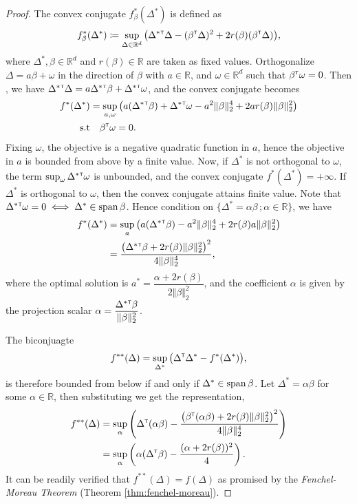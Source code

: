 \documentclass[12pt]{article}
\begin{document}
\begin{proof}
    The convex conjugate $f_\beta^*(\Delta^*)$ is defined as \[
    f_\beta^*(\Delta^*) \coloneqq \sup_{\Delta\in\mathbb{R}^d} \big( \Delta^*{^{\scriptscriptstyle \sf T}}\Delta - (\beta^{\scriptscriptstyle \sf T}\Delta)^2 + 2r(\beta) (\beta^{\scriptscriptstyle \sf T}\Delta) \big),
    \]where $\Delta^*,\beta \in\mathbb{R}^d$ and $r(\beta)\in\mathbb{R}$ are taken as fixed values. Orthogonalize $\Delta = a\beta + \omega$ in the direction of $\beta$ with $a\in\mathbb{R}$, and $\omega\in\mathbb{R}^d$ such that $\beta^{\scriptscriptstyle \sf T} \omega = 0$. Then , we have $\Delta^*{^{\scriptscriptstyle \sf T}}\Delta = a\Delta^*{^{\scriptscriptstyle \sf T}}\beta + \Delta^*{^{\scriptscriptstyle \sf T}}\omega$, and the convex conjugate becomes \begin{align*}
         f^*(\Delta^*) &= \sup_{a,\omega}\big(a (\Delta^*{^{\scriptscriptstyle \sf T}}\beta) + \Delta^*{^{\scriptscriptstyle \sf T}}\omega - a^2\Vert \beta\Vert_2^4 + 2ar(\beta)\Vert\beta\Vert_2^2 \big)\\
         \rm{s.t}&\quad \beta^{\scriptscriptstyle \sf T}\omega = 0.
    \end{align*}
    Fixing $\omega$, the objective is a negative quadratic function in $a$, hence the objective in $a$ is bounded from above by a finite value. Now, if $\Delta^*$ is not orthogonal to $\omega$, the term $\sup_\omega \Delta^*{^{\scriptscriptstyle \sf T}}\omega$ is unbounded, and the convex conjugate $f^*(\Delta^*) = +\infty$. If $\Delta^*$ is orthogonal to $\omega$, then the convex conjugate attains finite value. Note that $\Delta^*{^{\scriptscriptstyle \sf T}} \omega = 0 \iff \Delta^* \in \operatorname{span}{\beta}$. Hence condition on $\{\Delta^* = \alpha \beta\,;\alpha\in\mathbb{R}\}$, we have \begin{align*}
        f^*(\Delta^*) &= \sup_a \big(a(\Delta^*{^{\scriptscriptstyle \sf T}}\beta) - a^2 \Vert \beta\Vert_2^4 + 2r(\beta) a\Vert\beta\Vert_2^2 \big)\\
        &=\dfrac{\big(\Delta^*{^{\scriptscriptstyle \sf T}}\beta + 2r(\beta) \Vert \beta\Vert_2^2\big)^2}{4\Vert \beta\Vert_2^4},
    \end{align*} where the optimal solution is $a^* = \dfrac{\alpha + 2r(\beta)}{2\Vert \beta\Vert_2^2}$, and the coefficient $\alpha$ is given by the projection scalar $\alpha = \dfrac{\Delta^*{^{\scriptscriptstyle \sf T}}\beta}{\Vert\beta\Vert_2^2}$.

    The biconjuagte \[f^{**}(\Delta) = \sup_{\Delta^*} \big(\Delta^{\scriptscriptstyle \sf T}\Delta^* - f^*(\Delta^*)\big),\]
    is therefore bounded from below if and only if $\Delta^* \in \operatorname{span}{\beta}$. Let $\Delta^* = \alpha \beta$ for some $\alpha \in \mathbb{R}$, then substituting we get the representation,
    \begin{align*}
        f^{**}(\Delta) &= \sup_{\alpha} \left( \Delta^{\scriptscriptstyle \sf T} (\alpha\beta) - \dfrac{\big(\beta^{\scriptscriptstyle \sf T}(\alpha \beta) + 2r(\beta) \Vert \beta\Vert_2^2\big)^2}{4\Vert\beta\Vert_2^4}\right)\\
        &= \sup_{\alpha} \left(\alpha (\Delta^{\scriptscriptstyle \sf T}\beta) - \dfrac{(\alpha + 2r(\beta))^2}{4} \right).
    \end{align*}
    It can be readily verified that $f^{**}(\Delta) = f(\Delta)$ as promised by the \textit{Fenchel-Moreau Theorem} (Theorem \ref{thm:fenchel-moreau}).
\end{proof}
\end{document}
